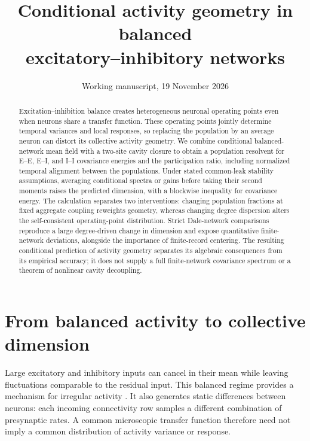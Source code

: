 \documentclass[11pt]{article}
\title{Conditional activity geometry in balanced\\excitatory--inhibitory networks}
\author{}
\date{Working manuscript, 19 November 2026}
\begin{document}
\maketitle
\begin{abstract}
Excitation--inhibition balance creates heterogeneous neuronal operating points
even when neurons share a transfer function. These operating points jointly
determine temporal variances and local responses, so replacing the population
by an average neuron can distort its collective activity geometry. We combine
conditional balanced-network mean field with a two-site cavity closure to
obtain a population resolvent for E--E, E--I, and I--I covariance energies and
the participation ratio, including normalized temporal alignment between the
populations. Under stated common-leak stability assumptions,
averaging conditional spectra or gains before taking their second moments
raises the predicted dimension, with a blockwise inequality for covariance
energy. The calculation separates two interventions: changing population
fractions at fixed aggregate coupling reweights geometry, whereas changing
degree dispersion alters the self-consistent operating-point distribution.
Strict Dale-network comparisons reproduce a large degree-driven change in
dimension and expose quantitative finite-network deviations, alongside the
importance of finite-record centering. The resulting conditional prediction
of activity geometry separates its algebraic consequences from its empirical
accuracy; it does not supply a full finite-network covariance spectrum or a
theorem of nonlinear cavity decoupling.
\end{abstract}

\section{From balanced activity to collective dimension}

Large excitatory and inhibitory inputs can cancel in their mean while leaving
fluctuations comparable to the residual input. This balanced regime provides
a mechanism for irregular activity \citep{vreeswijk1996,kadmon2015}. It also
generates static differences between neurons: each incoming connectivity row
samples a different combination of presynaptic rates. A common microscopic
transfer function therefore need not imply a common distribution of activity
variance or response.
\end{document}

